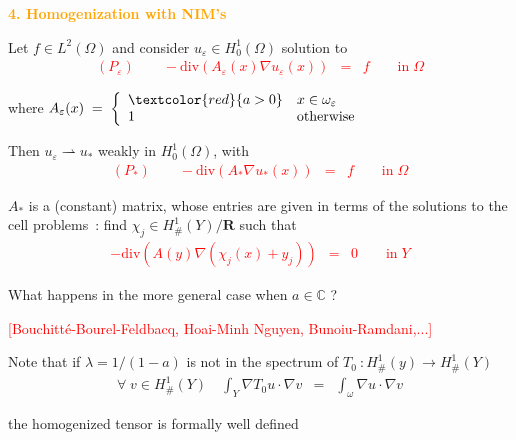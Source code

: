 \documentclass[mathserif,9pt]{beamer}
\def\e{{\varepsilon}}
\def\ds{\displaystyle}
\def\R{\mathbf R}
\begin{document}
\begin{frame}
\small{

\textcolor{orange}{\bf{\Large 4. Homogenization with NIM's }}
\bigskip


Let $f \in L^2(\Omega)$ and consider $u_\e \in H^1_0(\Omega)$ solution to
\textcolor{red}{
\begin{eqnarray*}
(P_\e) \quad\quad
- \textrm{div}(A_\e(x) \nabla u_\e(x)) &=& f 
\quad\quad \textrm{in}\; \Omega
\end{eqnarray*}}

where $A_\e(x) \;=\; \left\{ \begin{array}{ll}
\textcolor{red}{a > 0} & x \in \omega_\e
\\
1 & \textrm{otherwise}
\end{array} \right.$
\medskip

Then $u_\e \rightharpoonup u_*$ weakly in $H^1_0(\Omega)$, with
\textcolor{red}{
\begin{eqnarray*}
(P_*) \quad\quad
- \textrm{div}(A_* \nabla u_*(x)) &=& f 
\quad\quad \textrm{in}\; \Omega
\end{eqnarray*}}
\medskip

$A_*$ is a (constant) matrix, whose entries
are given in terms of the solutions to the cell problems~: 
find $\chi_j \in H^1_\#(Y)/\R$ such that
\textcolor{red}{
\begin{eqnarray*}
- \textrm{div}(A(y)\nabla(\chi_j(x) + y_j)) &=& 0 
\quad\quad \textrm{in}\; Y
\end{eqnarray*}}
\medskip

}
\end{frame}
\begin{frame}
\small{

What happens in the more general case when $a \in {\mathbb C}$ ?
\medskip

\textcolor{red}{[Bouchitt\'e-Bourel-Feldbacq, Hoai-Minh Nguyen,
Bunoiu-Ramdani,...]}
\bigskip

Note that if $\lambda = 1/(1-a)$ is not in the spectrum of $T_0~: H^1_\#(y) \rightarrow H^1_\#(Y)$
\begin{eqnarray*}
\forall\; v \in H^1_\#(Y) \quad
\ds\int_Y \nabla T_0u \cdot \nabla v
&=& \ds\int_\omega \nabla u \cdot \nabla v
\end{eqnarray*}

the homogenized tensor is formally well defined

}
\end{frame}
\end{document}

